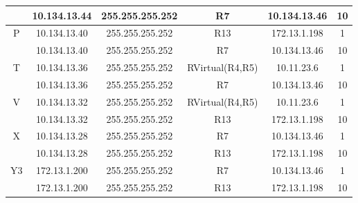 \documentclass[12pt, a4paper, spanish]{article}
\begin{document}
\begin{center}
\begin{tabular}{|c|c|c|c|c|c|}
	& 10.134.13.44 & 255.255.255.252 & R7 & 10.134.13.46 & 10\\
	\hline
	P & 10.134.13.40 & 255.255.255.252 & R13 & 172.13.1.198 & 1\\
	& 10.134.13.40 & 255.255.255.252 & R7 & 10.134.13.46 & 10\\
	\hline
	T & 10.134.13.36 & 255.255.255.252 & RVirtual(R4,R5) & 10.11.23.6 & 1\\
	& 10.134.13.36 & 255.255.255.252 & R7 & 10.134.13.46 & 10\\
	\hline
	V & 10.134.13.32 & 255.255.255.252 & RVirtual(R4,R5) & 10.11.23.6 & 1\\
	& 10.134.13.32 & 255.255.255.252 & R13 & 172.13.1.198 & 10\\
	\hline
	X & 10.134.13.28 & 255.255.255.252 & R7 & 10.134.13.46 & 1\\
	& 10.134.13.28 & 255.255.255.252 & R13 & 172.13.1.198 & 10\\
	\hline
	Y3 & 172.13.1.200 & 255.255.255.252 & R7 & 10.134.13.46 & 1\\
	& 172.13.1.200 & 255.255.255.252 & R13 & 172.13.1.198 & 10\\
	\hline
\end{tabular}
\end{center}
\end{document}
